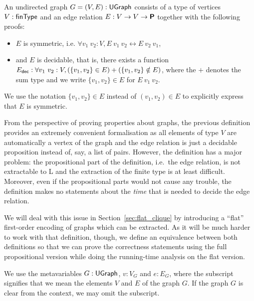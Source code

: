 \begin{definition}
  An undirected graph $G = (V, E) : \textsf{UGraph}$\mnote{\UGraph} consists of a type of vertices $V : \textsf{finType}$ and an edge relation $E : V \rightarrow V \rightarrow \textsf{\bfseries P}$ together with the following proofs:
  \begin{itemize}
    \item $E$ is symmetric, i.e. $\forall v_1~v_2 : V, E~v_1~v_2 \leftrightarrow E~v_2~v_1$, 
    \item and $E$ is decidable, that is, there exists a function $E_\textsf{dec} : \forall v_1~v_2 : V, (\{v_1, v_2\} \in E) + (\{v_1, v_2\} \notin E)$, where the $+$ denotes the sum type and we write $\{v_1, v_2\} \in E$ for $E~v_1~v_2$.
  \end{itemize}
  We use the notation $\{v_1, v_2\} \in E$ instead of $(v_1, v_2) \in E$ to explicitly express that $E$ is symmetric.
\end{definition}

\begin{remark}
  From the perspective of proving properties about graphs, the previous definition provides an extremely convenient formalisation as all elements of type $V$ are automatically a vertex of the graph and the edge relation is just a decidable proposition instead of, say, a list of pairs. 
  However, the definition has a major problem: the propositional part of the definition, i.e.\ the edge relation, is not extractable to L and the extraction of the finite type is at least difficult. Moreover, even if the propositional parts would not cause any trouble, the definition makes no statements about the \emph{time} that is needed to decide the edge relation. 

  We will deal with this issue in Section~\ref{sec:flat_clique} by introducing a ``flat'' first-order encoding of graphs which can be extracted. 
  As it will be much harder to work with that definition, though, we define an equivalence between both definitions so that we can prove the correctness statements using the full propositional version while doing the running-time analysis on the flat version.
\end{remark}

We use the metavariables $G : \textsf{UGraph}$, $v : V_G$ and $e : E_G$, where the subscript signifies that we mean the elements $V$ and $E$ of the graph $G$. If the graph $G$ is clear from the context, we may omit the subscript. 

